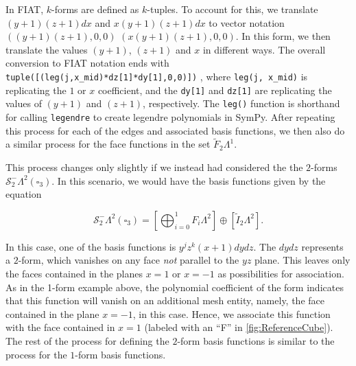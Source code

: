\documentclass[format=acmsmall,screen,timestamp=false,a4paper]{acmart}
\newcommand\lm[1]{\textbf{\textcolor[rgb]{1,0,0.5}{[Lawrence: #1]}}}
\newcommand{\calS}{\mathcal{S}}
\begin{document}
In FIAT, $k$-forms are defined as $k$-tuples.  To account for this, we translate $(y+1)(z+1)dx$ and $x(y+1)(z+1)dx$ to vector notation $((y+1)(z+1), 0, 0)$ $(x(y+1)(z+1),0,0)$.  In this form, we then translate the values $(y+1)$, $(z+1)$ and $x$ in different ways.  The overall conversion to FIAT notation ends with 
\texttt{tuple([(leg(j,x\_mid)*dz[1]*dy[1],0,0)])}
, where \texttt{leg(j, x\_mid)} is replicating the $1$ or $x$ coefficient, and the \texttt{dy[1]} and \texttt{dz[1]} are replicating the values of $(y+1)$ and $(z+1)$, respectively.  The \texttt{leg()} function is shorthand for calling \texttt{legendre} to create legendre polynomials in SymPy.  After repeating this process for each of the edges and associated basis functions, we then also do a similar process for the face functions in the set $\tilde{F}_2 \Lambda^1$.  

This process changes only slightly if we instead had considered the the $2$-forms $\mathcal{S}^-_2 \Lambda^2(\square_3)$.  In this scenario, we would have the basis functions given by the equation

\begin{equation*}
\calS^-_2\Lambda^2(\square_3) =    \left[\bigoplus_{i=0}^{1} F_i \Lambda^2\right] \oplus \left[\tilde{I}_2 \Lambda^2\right].
\end{equation*}

\noindent In this case, one of the basis functions is $y^jz^k(x+1)dydz$.  The $dydz$ represents a $2$-form, which vanishes on any face \textit{not} parallel to the $yz$ plane.  This leaves only the faces contained in the planes $x=1$ or $x=-1$ as possibilities for association. 
As in the 1-form example above, the polynomial coefficient of the form indicates that this function will vanish on an additional mesh entity, namely, the face contained in the plane $x=-1$, in this case.
Hence, we associate this function with the face contained in $x=1$ (labeled with an ``F'' in \cref{fig:ReferenceCube}).  The rest of the process for defining the $2$-form basis functions is similar to the process for the $1$-form basis functions.
\end{document}
